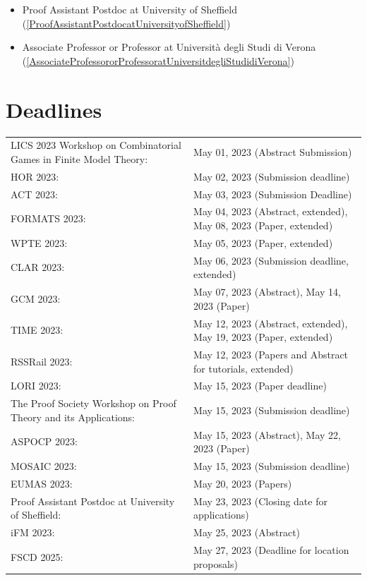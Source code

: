 \documentclass[prodmode,acmtecs]{acmsmall} %
\begin{document}
\begin{itemize}
\begin{itemize}\item Proof Assistant Postdoc at University of Sheffield (\cref{ProofAssistantPostdocatUniversityofSheffield})
\item Associate Professor or Professor at Università degli Studi di Verona (\cref{AssociateProfessororProfessoratUniversitdegliStudidiVerona})
\end{itemize} 
\end{itemize}\section{Deadlines}\label{deadlines}\begin{tabulary}{\linewidth}{LL}LICS 2023 Workshop on Combinatorial Games in Finite Model Theory:  & May 01, 2023 (Abstract Submission) \\
HOR 2023:  & May 02, 2023 (Submission deadline) \\
ACT 2023:  & May 03, 2023 (Submission Deadline) \\
FORMATS 2023:  & May 04, 2023 (Abstract, extended), May 08, 2023 (Paper, extended) \\
WPTE 2023:  & May 05, 2023 (Paper, extended) \\
CLAR 2023:  & May 06, 2023 (Submission deadline, extended) \\
GCM 2023:  & May 07, 2023 (Abstract), May 14, 2023 (Paper) \\
TIME 2023:  & May 12, 2023 (Abstract, extended), May 19, 2023 (Paper, extended) \\
RSSRail 2023:  & May 12, 2023 (Papers and Abstract for tutorials, extended) \\
LORI 2023:  & May 15, 2023 (Paper deadline) \\
The Proof Society Workshop on Proof Theory and its Applications:  & May 15, 2023 (Submission deadline) \\
ASPOCP 2023:  & May 15, 2023 (Abstract), May 22, 2023 (Paper) \\
MOSAIC 2023:  & May 15, 2023 (Submission deadline) \\
EUMAS 2023:  & May 20, 2023 (Papers) \\
Proof Assistant Postdoc at University of Sheffield:  & May 23, 2023 (Closing date for applications) \\
iFM 2023:  & May 25, 2023 (Abstract) \\
FSCD 2025:  & May 27, 2023 (Deadline for location proposals) \\

\end{tabulary}
\end{document}
